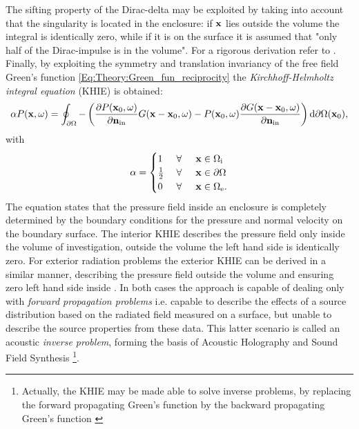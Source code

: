 The sifting property of the Dirac-delta may be exploited by taking into account that the singularity is located in the enclosure:
if $\mathbf{x}$ lies outside the volume the integral is identically zero, while if it is on the surface it is assumed that "only half of the Dirac-impulse is in the volume".
For a rigorous derivation refer to \cite{Williams1999}.
Finally, by exploiting the symmetry and translation invariancy of the free field Green's function \eqref{Eq:Theory:Green_fun_reciprocity} the \emph{Kirchhoff-Helmholtz integral equation} (KHIE) is obtained:
\begin{equation}
\alpha P(\mathbf{x},\omega) = 
\oint_{\partial \Omega} - \left( 
\frac{\partial P(\mathbf{x}_0,\omega)}{\partial \mathbf{n}_{\mathrm{in}}} G(\mathbf{x}-\mathbf{x}_0,\omega)
-
P(\mathbf{x}_0,\omega)  \frac{\partial G(\mathbf{x}-\mathbf{x}_0,\omega)}{\partial\mathbf{n}_{\mathrm{in}}} 
\right)   \mathrm{d} \partial \Omega( \mathbf{x}_0),
\label{Eq:Theory:Kirchhoff-Helmholtz}
\end{equation}
with
\begin{equation*}
\alpha = \begin{cases} 
1           & \hspace{1mm} \forall \hspace{5mm}  \mathbf{x} \in \Omega_{\mathrm{i}}  	   \\
\frac{1}{2} & \hspace{1mm} \forall \hspace{5mm}  \mathbf{x} \in \partial \Omega  \\
0 			& \hspace{1mm} \forall \hspace{5mm}  \mathbf{x} \in \Omega_{\mathrm{e}}.
\end{cases}
\end{equation*}
The equation states that the pressure field inside an enclosure is completely determined by the boundary conditions for the pressure and normal velocity on the boundary surface.
The interior KHIE describes the pressure field only inside the volume of investigation, outside the volume the left hand side is identically zero. 
For exterior radiation problems the exterior KHIE can be derived in a similar manner, describing the pressure field outside the volume and ensuring zero left hand side inside \cite{Williams1999}.
In both cases the approach is capable of dealing only with \emph{forward propagation problems} i.e. capable to describe the effects of a source distribution based on the radiated field measured on a surface, but unable to describe the source properties from these data. 
This latter scenario is called an acoustic \emph{inverse problem}, forming the basis of Acoustic Holography and Sound Field Synthesis 
\footnote{Actually, the KHIE may be made able to solve inverse problems, by replacing the forward propagating Green's function by the backward propagating Green's function \cite{Wapenaar1989}}.
\vspace{3mm}

